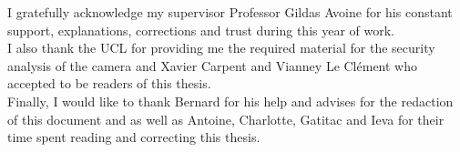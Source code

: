 \vspace{5cm}

I gratefully acknowledge my supervisor Professor Gildas Avoine for his constant support, explanations, corrections and trust during this year of work.\\

I also thank the UCL for providing me the required material for the security analysis of the camera and Xavier Carpent and Vianney Le Clément who accepted to be readers of this thesis.\\

Finally, I would like to thank Bernard for his help and advises for the redaction of this document and as well as Antoine, Charlotte, Gatitac and Ieva for their time spent reading and correcting this thesis.
